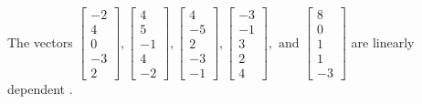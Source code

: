 \begin{exercise}
\begin{exerciseStatement}
  \end{exerciseStatement}
  \begin{exerciseAnswer}
   The vectors \(\left[\begin{array}{r}
-2 \\
4 \\
0 \\
-3 \\
2
\end{array}\right] , \left[\begin{array}{r}
4 \\
5 \\
-1 \\
4 \\
-2
\end{array}\right] , \left[\begin{array}{r}
4 \\
-5 \\
2 \\
-3 \\
-1
\end{array}\right] , \left[\begin{array}{r}
-3 \\
-1 \\
3 \\
2 \\
4
\end{array}\right] , \text{ and } \left[\begin{array}{r}
8 \\
0 \\
1 \\
1 \\
-3
\end{array}\right]\) are 
  	 linearly dependent  .
  


  \end{exerciseAnswer}
\end{exercise}
